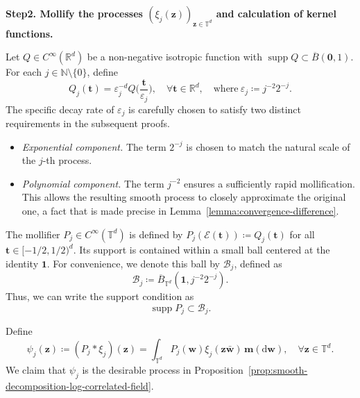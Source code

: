 \documentclass[12pt]{amsart}
\theoremstyle{definition}
\theoremstyle{remark}
\newcommand{\bt}{\boldsymbol{t}}
\newcommand{\bz}{\boldsymbol{z}}
\newcommand{\bw}{\boldsymbol{w}}
\newcommand{\R}{\mathbb{R}}
\newcommand{\N}{\mathbb{N}}
\newcommand{\T}{\mathbb{T}}
\newcommand{\supp}{\operatorname{supp}}
\numberwithin{equation}{section}
\begin{document}
\medskip
{\flushleft \bf Step2. Mollify the processes $(\xi_j(\bz))_{\bz\in \T^d}$ and calculation of kernel functions. }
\medskip

Let $Q\in C^\infty(\R^d)$ be a non-negative isotropic function with $\supp Q\subset \overline{B}(\boldsymbol{0},1)$. For each $j\in \N\setminus\{0\}$, define
\[
Q_j(\bt)=\varepsilon_j^{-d}Q\bigg(\frac{\bt}{\varepsilon_j}\bigg),\quad \forall \bt\in \R^d,\quad \text{where}~\varepsilon_j\coloneq j^{-2}2^{-j}.
\]
 The specific decay rate of $\varepsilon_j$ is carefully chosen to satisfy two distinct requirements in the subsequent proofs.
\begin{itemize}
    \item \textit{Exponential component.} The term $2^{-j}$ is chosen to match the natural scale of the $j$-th process. 
    \item \textit{Polynomial component.} The term $j^{-2}$ ensures a sufficiently rapid mollification. This allows the resulting smooth process to closely approximate the original one, a fact that is made precise in Lemma~\ref{lemma:convergence-difference}.
\end{itemize}

The mollifier $P_j \in C^\infty(\T^d)$ is defined by $P_j(\mathcal{E}(\mathbf{t})) \coloneqq Q_j(\bt)$ for all $\bt \in [-1/2, 1/2)^d$. Its support is contained within a small ball centered at the identity $\boldsymbol{1}$. For convenience, we denote this ball by $\mathcal{B}_j$, defined as
\begin{equation}\label{eq:def-mathcalBj}
	\mathcal{B}_j \coloneqq \overline{B}_{\mathbb{T}^d}(\mathbf{1}, j^{-2}2^{-j}).
\end{equation}
Thus, we can write the support condition as
\begin{equation}\label{eq:supp-Pj}
	\supp P_j \subset \mathcal{B}_j.
\end{equation}

Define
\[
\psi_j(\bz)\coloneq (P_j*\xi_j)(\bz)=\int_{\T^d} P_j(\bw)\xi_j(\bz\bar{\bw})\,\boldsymbol{m}(\mathrm{d}\bw),\quad \forall \bz\in \T^d.
\]
We claim that $\psi_j$ is the desirable process in Proposition~\ref{prop:smooth-decomposition-log-correlated-field}. 
\end{document}
